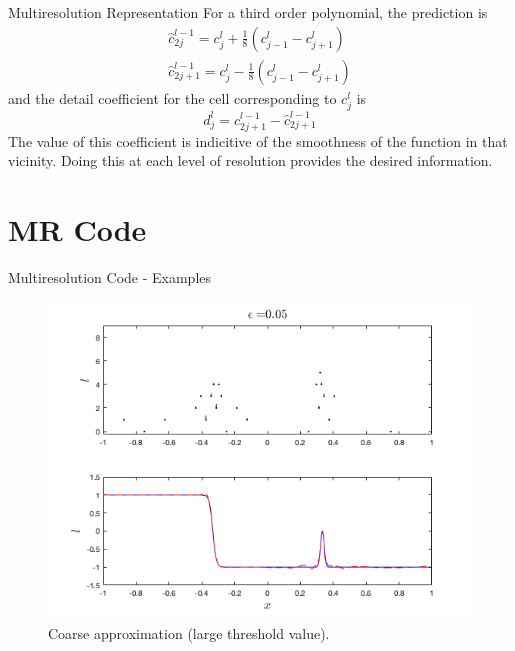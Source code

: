 \documentclass{beamer}
\begin{document}
\begin{frame}[shrink=15]{Multiresolution Representation}
	For a third order polynomial, the prediction is
	\begin{align*}
		\hat{c}^{l-1}_{2j} = c^{l}_{j} + \frac{1}{8} \left( c^{l}_{j-1} - c^{l}_{j+1} \right) \\
		\hat{c}^{l-1}_{2j+1} = c^{l}_{j} - \frac{1}{8} \left( c^{l}_{j-1} - c^{l}_{j+1} \right)
	\end{align*}
	and the detail coefficient for the cell corresponding to $c^{l}_{j}$ is
	\begin{equation*}
		d^{l}_{j} = c_{2j+1}^{l-1} - \hat{c}_{2j+1}^{l-1}
	\end{equation*}
	The value of this coefficient is indicitive of the smoothness of the function in that vicinity. Doing this at
	each level of resolution provides the desired information.
	
\end{frame}


\section{MR Code}

\begin{frame}[shrink=15]{Multiresolution Code - Examples}
	\begin{figure}
		\center
		\includegraphics[scale=0.5]{plots/spike-low.png}
		\caption{Coarse approximation (large threshold value).}
	\end{figure}	
\end{frame}
\end{document}
